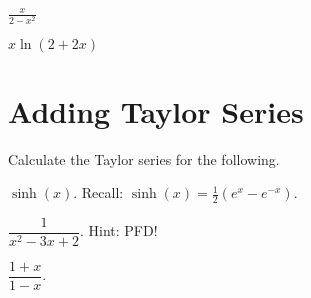 \documentclass[paper=letter, 11pt]{article}
\begin{document}
\Prob $\frac{x}{2 - x^2}$\vfill

\Prob $x\ln(2 + 2x)$\vfill

\newpage

\section*{Adding Taylor Series}

Calculate the Taylor series for the following.\bigskip

\Prob $\sinh(x)$. \quad Recall: $\sinh(x) = \frac{1}{2}(e^x - e^{-x})$.\vfill

\Prob $\dfrac{1}{x^2 - 3x + 2}$. \quad Hint: PFD!\vfill

\Prob $\dfrac{1 + x}{1 - x}$.\vfill

\newpage



\newpage
\end{document}
